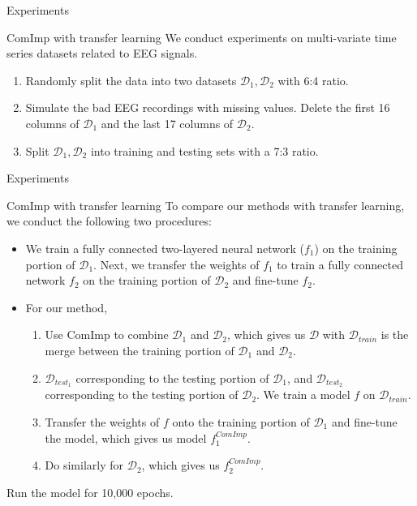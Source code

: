 \documentclass[xcolor={dvipsnames}]{beamer} %
\begin{document}
\begin{frame}{Experiments}
\begin{block}{ComImp with transfer learning}
    We conduct experiments on multi-variate time series datasets related to EEG signals.
    \begin{enumerate}
        \item Randomly split the data into two datasets $\mathcal{D}_1, \mathcal{D}_2$ with 6:4 ratio.
        \item Simulate the bad EEG recordings with missing values. Delete the first 16 columns of $\mathcal{D}_1$ and the last 17 columns of $\mathcal{D}_2$.
        \item Split $\mathcal{D}_1, \mathcal{D}_2$ into training and testing sets with a 7:3 ratio.
    \end{enumerate}
\end{block}
\end{frame}

\begin{frame}{Experiments}
\begin{block}{ComImp with transfer learning}
To compare our methods with transfer learning, we conduct the following two procedures: 

\begin{itemize}
\item We train a fully connected two-layered neural network ($f_1$) on the training portion of $\mathcal{D}_1$. Next, we transfer the weights of $f_1$ to train a fully connected network $f_2$ on the training portion of $\mathcal{D}_2$ and fine-tune $f_2$. 

\item For our method,
\begin{enumerate}
    \item Use ComImp to combine $\mathcal{D}_1$ and $\mathcal{D}_2$, which gives us $\mathcal{D}$ with $\mathcal{D}_{train}$ is the merge between the training portion of $\mathcal{D}_1$ and $\mathcal{D}_2$.
    \item $\mathcal{D}_{test_1}$ corresponding to the testing portion of $\mathcal{D}_1$, and $\mathcal{D}_{test_2}$ corresponding to the testing portion of $\mathcal{D}_2$. We train a model $f$ on $\mathcal{D}_{train}$.
    \item Transfer the weights of $f$ onto the training portion of $\mathcal{D}_1$ and fine-tune the model, which gives us model $f^{ComImp}_{1}$.
    \item Do similarly for $\mathcal{D}_2$, which gives us $f^{ComImp}_{2}$.
\end{enumerate}
\end{itemize}
Run the model for 10,000 epochs.
\end{block}
\end{frame}
\end{document}
